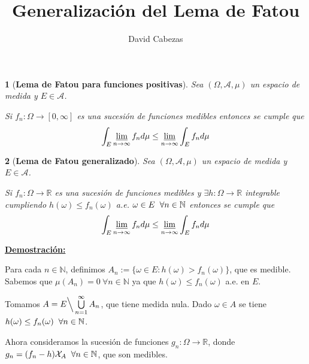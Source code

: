 \documentclass{article}
\newtheorem*{theorem}{}
\begin{document}
\title{\Large Generalización del Lema de Fatou}
\author{David Cabezas}
\date{}
\maketitle

\begin{theorem}[\textbf{Lema de Fatou para funciones positivas}]
  Sea $(\Omega,\mathcal{A},\mu)$ un espacio de medida y
  $E \in \mathcal{A}$.

  Si $f_n:\Omega \longrightarrow [0,\infty]$ es una sucesión de
  funciones medibles entonces se cumple que
  \[\int_E\varliminf\limits_{n\to\infty} f_n d\mu \leq
    \varliminf\limits_{n\to\infty} \int_Ef_nd\mu\]
\end{theorem}

\begin{theorem}[\textbf{Lema de Fatou generalizado}]
  Sea $(\Omega,\mathcal{A},\mu)$ un espacio de medida y
  $E \in \mathcal{A}$.

  Si $f_n:\Omega \longrightarrow \mathbb{R}$ es una sucesión de
  funciones medibles y $\exists h:\Omega \longrightarrow \mathbb{R}$
  integrable cumpliendo $h(\omega) \leq f_n(\omega)$ a.e.
  $\omega \in E \hspace{2mm} \forall n \in \mathbb{N}$ entonces se
  cumple que
  \[\int_E\varliminf\limits_{n\to\infty} f_n d\mu \leq
    \varliminf\limits_{n\to\infty} \int_Ef_nd\mu\]
\end{theorem}

\textbf{\underline{Demostración:}}

Para cada $n \in \mathbb{N}$, definimos
$A_n:=\{\omega \in E : h(\omega) > f_n(\omega)\}$, que es medible. \\
Sabemos que $\mu(A_n)=0 \ \forall n \in \mathbb{N}$ ya que
$h(\omega) \leq f_n(\omega)$ a.e. en $E$.

Tomamos $A=E\Big\backslash\bigcup\limits_{n=1}^\infty A_n$, que tiene
medida nula. Dado $\omega \in A$ se tiene
$h(\omega) \leq f_n(\omega) \hspace{2mm} \forall n \in \mathbb{N}$.

Ahora consideramos la sucesión de funciones
$g_n:\Omega \longrightarrow \mathbb{R}$, donde
$g_n=(f_n-h)\mathcal{X}_A \hspace{2mm} \forall n \in \mathbb{N}$, que
son medibles.
\end{document}
